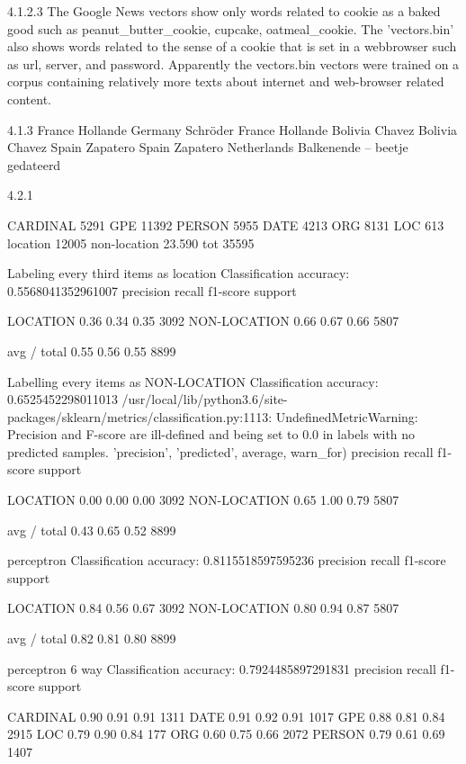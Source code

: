 \documentclass[11pt]{article}
\begin{document}
4.1.2.3
The Google News vectors show only words related to cookie as a baked good such as peanut_butter_cookie, cupcake, oatmeal_cookie. The 'vectors.bin' also shows words related to the sense of a cookie that is set in a webbrowser such as url, server, and password. Apparently the vectors.bin vectors were trained on a corpus containing relatively more texts about internet and web-browser related content.

4.1.3
France Hollande Germany Schröder
France Hollande Bolivia Chavez
Bolivia Chavez Spain Zapatero
Spain Zapatero Netherlands Balkenende
-- beetje gedateerd

4.2.1

CARDINAL 5291
GPE 11392
PERSON 5955
DATE 4213
ORG 8131
LOC 613
location 12005
non-location 23.590
tot 35595

Labeling every third items as location
Classification accuracy: 0.5568041352961007
              precision    recall  f1-score   support

    LOCATION       0.36      0.34      0.35      3092
NON-LOCATION       0.66      0.67      0.66      5807

 avg / total       0.55      0.56      0.55      8899

Labelling every items as NON-LOCATION
Classification accuracy: 0.6525452298011013
/usr/local/lib/python3.6/site-packages/sklearn/metrics/classification.py:1113: UndefinedMetricWarning: Precision and F-score are ill-defined and being set to 0.0 in labels with no predicted samples.
  'precision', 'predicted', average, warn_for)
              precision    recall  f1-score   support

    LOCATION       0.00      0.00      0.00      3092
NON-LOCATION       0.65      1.00      0.79      5807

 avg / total       0.43      0.65      0.52      8899

perceptron
Classification accuracy: 0.8115518597595236
              precision    recall  f1-score   support

    LOCATION       0.84      0.56      0.67      3092
NON-LOCATION       0.80      0.94      0.87      5807

 avg / total       0.82      0.81      0.80      8899

perceptron 6 way
Classification accuracy: 0.7924485897291831
             precision    recall  f1-score   support

   CARDINAL       0.90      0.91      0.91      1311
       DATE       0.91      0.92      0.91      1017
        GPE       0.88      0.81      0.84      2915
        LOC       0.79      0.90      0.84       177
        ORG       0.60      0.75      0.66      2072
     PERSON       0.79      0.61      0.69      1407
\end{document}
